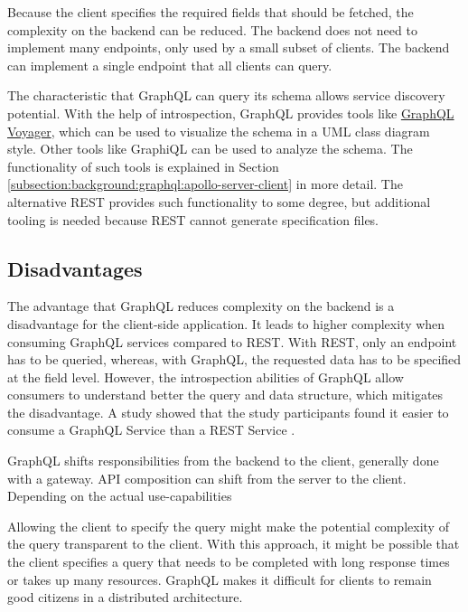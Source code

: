 \bigskip

\noindent Because the client specifies the required fields that should be fetched, the complexity on the backend can be reduced. The backend does not need to implement many endpoints, only used by a small subset of clients. The backend can implement a single endpoint that all clients can query. \cite{book:2018:richardson:background:bff:microservices-patterns}

\bigskip

\noindent The characteristic that GraphQL can query its schema allows service discovery potential. With the help of introspection, GraphQL provides tools like \href{https://ivangoncharov.github.io/graphql-voyager/}{GraphQL Voyager}, which can be used to visualize the schema in a \ac{UML} class diagram style. Other tools like GraphiQL can be used to analyze the schema. The functionality of such tools is explained in Section \ref{subsection:background:graphql:apollo-server-client} in more detail. The alternative \ac{REST} provides such functionality to some degree, but additional tooling is needed because \ac{REST} cannot generate specification files.

\subsection{Disadvantages}\label{subsection:background:graphql:graphql-disadvantages}

\noindent The advantage that GraphQL reduces complexity on the backend is a disadvantage for the client-side application. It leads to higher complexity when consuming GraphQL services compared to \ac{REST}. With \ac{REST}, only an endpoint has to be queried, whereas, with GraphQL, the requested data has to be specified at the field level. However, the introspection abilities of GraphQL allow consumers to understand better the query and data structure, which mitigates the disadvantage. A study \cite{inproceedings:2020:brito:background:graphql:rest-vs-graphql} showed that the study participants found it easier to consume a GraphQL Service than a \ac{REST} Service \cite{inproceedings:2017:de-pauda:background:graphql:handling-anti-patterns}.

\bigskip

\noindent GraphQL shifts responsibilities from the backend to the client, generally done with a gateway. \ac{API} composition can shift from the server to the client. Depending on the actual use-capabilities

\bigskip

\noindent Allowing the client to specify the query might make the potential complexity of the query transparent to the client. With this approach, it might be possible that the client specifies a query that needs to be completed with long response times or takes up many resources. GraphQL makes it difficult for clients to remain good citizens in a distributed architecture. \cite{book:2018:richardson:background:bff:microservices-patterns}





